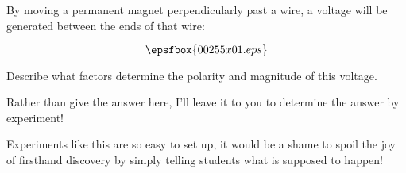 

By moving a permanent magnet perpendicularly past a wire, a voltage will be generated between the ends of that wire:

$$\epsfbox{00255x01.eps}$$

Describe what factors determine the polarity and magnitude of this voltage.







Rather than give the answer here, I'll leave it to you to determine the answer by experiment!







Experiments like this are so easy to set up, it would be a shame to spoil the joy of firsthand discovery by simply telling students what is supposed to happen!



